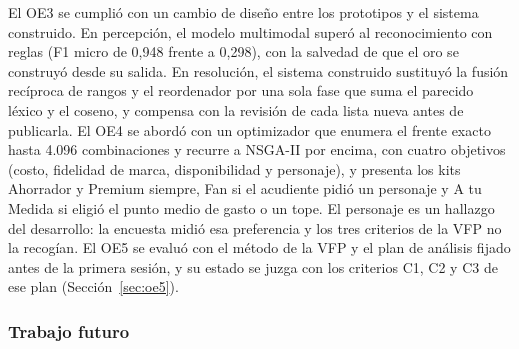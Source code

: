 El OE3 se cumplió con un cambio de diseño entre los prototipos y el sistema construido. En
percepción, el modelo multimodal superó al reconocimiento con reglas (F1 micro de 0,948 frente a
0,298), con la salvedad de que el oro se construyó desde su salida. En resolución, el sistema
construido sustituyó la fusión recíproca de rangos y el reordenador por una sola fase que suma el
parecido léxico y el coseno, y compensa con la revisión de cada lista nueva antes de publicarla. El
OE4 se abordó con un optimizador que enumera el frente exacto hasta 4.096 combinaciones y recurre a
NSGA-II \citep{deb_fast_2002,blank_pymoo_2020} por encima, con cuatro objetivos (costo, fidelidad
de marca, disponibilidad y personaje), y presenta los kits Ahorrador y Premium siempre, Fan si el
acudiente pidió un personaje y A tu Medida si eligió el punto medio de gasto o un tope. El personaje
es un hallazgo del desarrollo: la encuesta midió esa preferencia y los tres criterios de la VFP no la
recogían. El OE5 se evaluó con el método de la VFP y el plan de análisis fijado antes de la primera
sesión, y su estado se juzga con los criterios C1, C2 y C3 de ese plan (Sección~\ref{sec:oe5}).

\subsubsection{Trabajo futuro}
\label{sec:trabajo-futuro}

